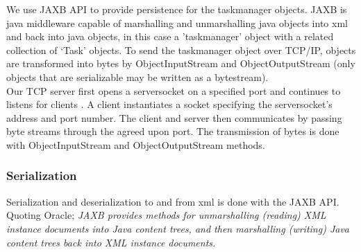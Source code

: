 \begin{comment}
Information in OO programs are typically stored as data structures whereas data in the messages used to communicate in distributed systems are binary. So, no matter the communication protocols used the data structures need to be flattened before transmitting and then reassembled at the other end. This is called marshalling and unmarshalling. The sender and transmitter must agree on the format used in order for the receiver to reassmble the data structures. CORBA, Java Object Serialization and XML are som of the formats used to transmit binary data from one node to another. \\

This can (as it often is) be done by middleware. In this project we have used JAXB to marshall our taskmanager data structure. JAXB use a XML format to transfer binary data. This works by annotating the data structures. Our taskmanager data structure in this case. JAXB can then marshall and unmarshall our data structure.\\
\end{comment}


We use JAXB API to provide persistence for the taskmanager objects. JAXB is java middleware capable of marshalling and unmarshalling java objects into xml and back into java objects, in this case a 'taskmanager' object with a related collection of ‘Task’ objects. To send the taskmanager object over TCP/IP, objects are transformed into bytes by ObjectInputStream and ObjectOutputStream (only objects that are serializable may be written as a bytestream).   \\ 

Our TCP server first opens a serversocket on a specified port and continues to listens for clients . A client instantiates a socket specifying the serversocket's address and port number. The client and server then communicates by passing byte streams through the agreed upon port. The transmission of bytes is done with ObjectInputStream and ObjectOutputStream methods.  \\

\subsubsection{Serialization}
Serialization and deserialization to and from xml is done with the JAXB API. Quoting Oracle; \textit{JAXB provides methods for unmarshalling (reading) XML instance documents into Java content trees, and then marshalling (writing) Java content trees back into XML instance documents.} \\

